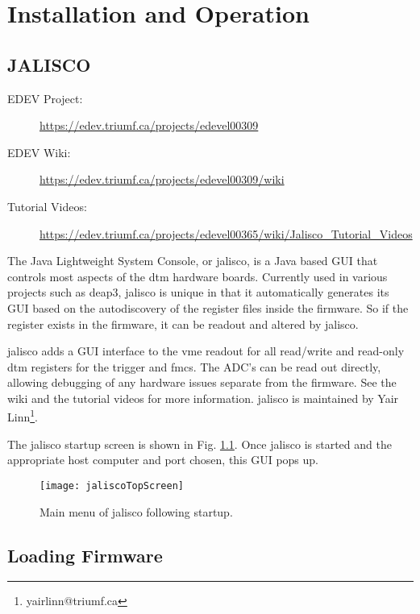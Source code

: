 \chapter{Installation and Operation}
\label{chap:install}
\section{JALISCO}
\label{sec:jalisco}
\begin{description}
\item[EDEV Project:] \url{https://edev.triumf.ca/projects/edevel00309}
\item[EDEV Wiki:] \url{https://edev.triumf.ca/projects/edevel00309/wiki}
\item[Tutorial Videos:] \url{https://edev.triumf.ca/projects/edevel00365/wiki/Jalisco_Tutorial_Videos}
\end{description}
The Java Lightweight System Console, or \gls{jalisco}, is a Java based GUI that controls most aspects of the \gls{dtm} hardware boards. Currently used in various projects such as \gls{deap3}, \gls{jalisco} is unique in that it automatically generates its GUI based on the autodiscovery of the register files inside the firmware. So if the register exists in the firmware, it can be readout and altered by \gls{jalisco}.

\gls{jalisco} adds a GUI interface to the \gls{vme} readout for all read/write and read-only \gls{dtm} registers for the trigger and \gls{fmc}s. The ADC's can be read out directly, allowing debugging of any hardware issues separate from the firmware. See the wiki and the tutorial videos for more information. \gls{jalisco} is maintained by Yair Linn\footnote{yairlinn@triumf.ca}.

The \gls{jalisco} startup screen is shown in Fig. \ref{Fig:jaliscoTopScreen}. Once \gls{jalisco} is started and the appropriate host computer and port chosen, this GUI pops up. 
\begin{figure}[ht]
\centering
\texttt{[image: jaliscoTopScreen]}
\caption{Main menu of \gls{jalisco} following startup.}
\label{Fig:jaliscoTopScreen}
\end{figure}

\clearpage

\section{Loading Firmware}

